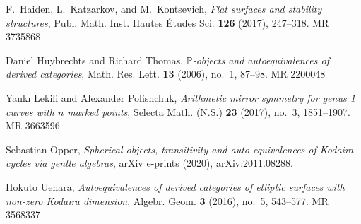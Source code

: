 \documentclass[a0,landscape]{a0poster}
\providecommand{\MR}{\relax\ifhmode\unskip\space\fi MR }
\theoremstyle{plain}
\theoremstyle{definition}
\begin{document}
\begin{multicols}{3}
    \vspace*{-1cm}

    \begin{thebibliography}{99}
        {
        \small
        F.~Haiden, L.~Katzarkov, and M.~Kontsevich, \emph{Flat surfaces and stability structures}, Publ. Math. Inst. Hautes \'{E}tudes Sci. \textbf{126} (2017), 247--318. \MR {3735868}

        Daniel Huybrechts and Richard Thomas, \emph{{$\mathbb P$}-objects and autoequivalences of derived categories}, Math. Res. Lett. \textbf{13} (2006), no.~1, 87--98. \MR{2200048}

        Yank{\i} Lekili and Alexander Polishchuk, \emph{Arithmetic mirror symmetry for genus 1 curves with {$n$} marked points}, Selecta Math. (N.S.) \textbf{23} (2017), no.~3, 1851--1907. \MR{3663596}

        Sebastian {Opper}, \emph{{Spherical objects, transitivity and auto-equivalences of Kodaira cycles via gentle algebras}}, arXiv e-prints (2020), arXiv:2011.08288.

        Hokuto Uehara, \emph{Autoequivalences of derived categories of elliptic surfaces with non-zero {K}odaira dimension}, Algebr. Geom. \textbf{3} (2016), no.~5, 543--577. \MR{3568337}
        }
    \end{thebibliography}


\end{multicols}
\end{document}
